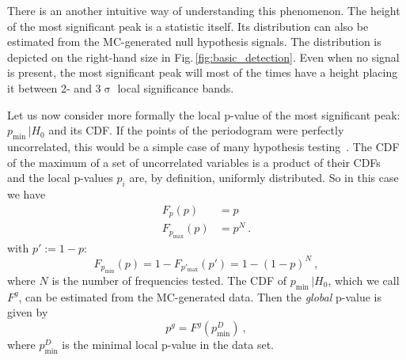 There is an another intuitive way of understanding this phenomenon. The height of the most significant peak is a statistic itself. Its distribution can also be estimated from the MC-generated null hypothesis signals. The distribution is depicted on the right-hand size in Fig.\,\ref{fig:basic_detection}. Even when no signal is present, the most significant peak will most of the times have a height placing it between 2- and 3$\upsigma$ local significance bands.

Let us now consider more formally the local p-value of the most significant peak: $p_\text{min} \, | H_0$ and its CDF\@. If the points of the periodogram were perfectly uncorrelated, this would be a simple case of many hypothesis testing~\cite{Algeri2016}. The CDF of the maximum of a set of uncorrelated variables is a product of their CDFs~\cite{Papoulis2002} and the local p-values $p_i$ are, by definition, uniformly distributed. So in this case we have
\begin{align}\label{eq:Fpmin}
  F_p(p) &= p \\
  F_{p_\text{max}}(p) &= p^N \ .
\end{align}
with $p' := 1 - p$:
\begin{equation}
  F_{p_\text{min}}(p) = 1 - F_{p'_\text{max}}(p') = 1 - {(1 - p)}^N \ ,
  \label{eq:global_CDF_functional_form}
\end{equation}
where $N$ is the number of frequencies tested.
The CDF of $p_\text{min} \, | H_0$, which we call $F^g$, can be estimated from the MC-generated data. Then the \emph{global} p-value is given by
\begin{equation}
  p^g = F^g(p_\text{min}^D) \ ,
\end{equation}
where $p_\text{min}^D$ is the minimal local p-value in the data set.

